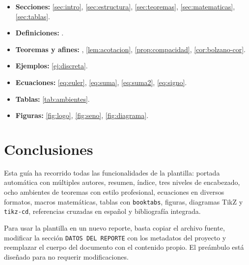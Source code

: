 \documentclass[letterpaper, 11pt]{article}
\begin{document}
\begin{itemize}
    \item \textbf{Secciones:} \cref{sec:intro}, \cref{sec:estructura},
        \cref{sec:teoremas}, \cref{sec:matematicas}, \cref{sec:tablas}.
    \item \textbf{Definiciones:} .
    \item \textbf{Teoremas y afines:} ,
        \cref{lem:acotacion}, \cref{prop:compacidad},
        \cref{cor:bolzano-cor}.
    \item \textbf{Ejemplos:} \cref{ej:discreta}.
    \item \textbf{Ecuaciones:} \cref{eq:euler}, \cref{eq:suma},
        \cref{eq:suma2}, \cref{eq:signo}.
    \item \textbf{Tablas:} \cref{tab:ambientes}.
    \item \textbf{Figuras:} \cref{fig:logo}, \cref{fig:seno},
        \cref{fig:diagrama}.
\end{itemize}

\section{Conclusiones}\label{sec:conclusiones}

Esta guía ha recorrido todas las funcionalidades de la plantilla:
portada automática con múltiples autores, resumen, índice, tres
niveles de encabezado, ocho ambientes de teoremas con estilo
profesional, ecuaciones en diversos formatos, macros matemáticas,
tablas con \texttt{booktabs}, figuras, diagramas TikZ y
\texttt{tikz-cd}, referencias cruzadas en español y bibliografía
integrada.

Para usar la plantilla en un nuevo reporte, basta copiar el archivo
fuente, modificar la sección \texttt{DATOS DEL REPORTE} con los
metadatos del proyecto y reemplazar el cuerpo del documento con el
contenido propio. El preámbulo está diseñado para no requerir
modificaciones.

\nocite{*}
\printbibliography[heading=bibintoc, title={Referencias}]
\end{document}
